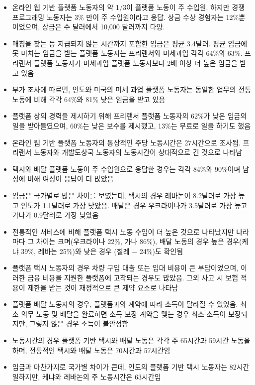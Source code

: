 \begin{itemize}
\begin{itemize}
		\begin{itemize}
		\item 온라인 웹 기반 플랫폼 노동자의 약 1/3이 플랫폼 노동이 주 수입원. 하지만 경쟁 프로그래밍 노동자는 3\% 만이 주 수입원이라고 응답. 상금 수상 경험자는 12\%뿐이었으며, 상금은 수 달러에서 10,000 달러까지 다양.
		\item 매칭을 찾는 등 지급되지 않는 시간까지 포함한 임금은 평균 3.4달러. 평균 임금에 못 미치는 임금을 받는 플랫폼 노동자는 프리랜서와 미세과업 각각 64\%와 63\%. 프리랜서 플랫폼 노동자가 미세과업 플랫폼 노동자보다 2배 이상 더 높은 임금을 받고 있음
		\item 부가 조사에 따르면, 인도와 미국의 미세 과업 플랫폼 노동자는 동일한 업무의 전통 노동에 비해 각각 64\%와 81\% 낮은 임금을 받고 있음
		\item 플랫폼 상의 경력을 제시하기 위해 프리랜서 플랫폼 노동자의 62\%가 낮은 임금의 일을 받아들였으며, 60\%는 낮은 보수를 제시했고, 13\%는 무료로 일을 하기도 했음
		\item 온라인 웹 기반 플랫폼 노동자의 통상적인 주당 노동시간은 27시간으로 조사됨. 프리랜서 노동자와 개발도상국 노동자의 노동시간이 상대적으로 긴 것으로 나타남
		\item 택시와 배달 플랫폼 노동이 주 수입원으로 응답한 경우는 각각 84\%와 90\%이며 남성에 비해 여성이 응답이 더 많았음
		\item 임금은 국가별로 많은 차이를 보였는데, 택시의 경우 레바논이 8.2달러로 가장 높고 인도가 1.1달러로 가장 낮았음. 배달은 경우 우크라이나가 3.5달러로 가장 높고 가나가 0.9달러로 가장 낮았음
		\item 전통적인 서비스에 비해 플랫폼 택시 노동 수입이 더 높은 것으로 나타났지만 나라마다 그 차이는 크며(우크라이나 22\%, 가나 86\%), 배달 노동의 경우 높은 경우(케냐 39\%, 레바논 25\%)와 낮은 경우 (칠레 $-$ 24\%)도 확인됨
		\item 플랫폼 택시 노동자의 경우 차량 구입 대출 또는 임대 비용이 큰 부담이었으며, 이러한 금융 비용을 지원한 플랫폼에 고착되는 경우도 많았음. 그외 사고 시 보험 적용이 제한을 받는 것이 재정적으로 큰 제약 요소로 나타남
		\item 플랫폼 배달 노동자의 경우, 플랫폼과의 계약에 따라 소득이 달라질 수 있었음. 최소 의무 노동 및 배달을 완료하면 소득 보장 계약을 맺는 경우 최소 소득이 보장되지만, 그렇지 않은 경우 소득이 불안정함
		\item 노동시간의 경우 플랫폼 기반 택시와 배달 노동은 각각 주 65시간과 59시간 노동을 하며, 전통적인 택시와 배달 노동은 70시간과 57시간임
		\item 임금과 마찬가지로 국가별 차이가 큰데, 인도의 플랫폼 기반 택시 노동자는 82시간 일하지만, 케냐와 레바논의 주 노동시간은 63시간임
		\end{itemize}
	

\end{itemize}
\end{itemize}
